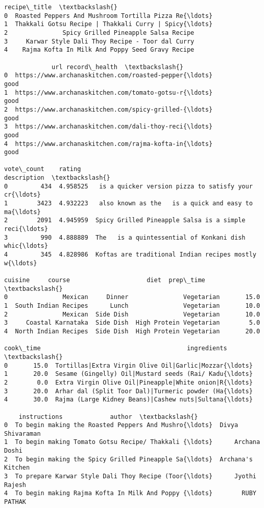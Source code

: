 \documentclass[14pt,a4paper,oneside]{extarticle}
\makeatletter
\newcommand{\boxspacing}{\kern\kvtcb@left@rule\kern\kvtcb@boxsep}
\newcommand{\prompt}[4]{
        {\ttfamily\llap{{\color{#2}[#3]:\hspace{3pt}#4}}\vspace{-\baselineskip}}
    }
\makeatother
\begin{document}
\begin{tcolorbox}[breakable, size=fbox, boxrule=.5pt,
	pad at break*=1mm, opacityfill=0]
\prompt{Out}{outcolor}{54}{\boxspacing}
\begin{Verbatim}[commandchars=\\\{\}]
	recipe\_title  \textbackslash{}
0  Roasted Peppers And Mushroom Tortilla Pizza Re{\ldots}
1  Thakkali Gotsu Recipe | Thakkali Curry | Spicy{\ldots}
2               Spicy Grilled Pineapple Salsa Recipe
3     Karwar Style Dali Thoy Recipe - Toor dal Curry
4    Rajma Kofta In Milk And Poppy Seed Gravy Recipe

			 url record\_health  \textbackslash{}
0  https://www.archanaskitchen.com/roasted-pepper{\ldots}          good
1  https://www.archanaskitchen.com/tomato-gotsu-r{\ldots}          good
2  https://www.archanaskitchen.com/spicy-grilled-{\ldots}          good
3  https://www.archanaskitchen.com/dali-thoy-reci{\ldots}          good
4  https://www.archanaskitchen.com/rajma-kofta-in{\ldots}          good

vote\_count    rating                                        description  \textbackslash{}
0         434  4.958525   is a quicker version pizza to satisfy your cr{\ldots}
1        3423  4.932223   also known as the   is a quick and easy to ma{\ldots}
2        2091  4.945959  Spicy Grilled Pineapple Salsa is a simple reci{\ldots}
3         990  4.888889  The   is a quintessential of Konkani dish whic{\ldots}
4         345  4.828986  Koftas are traditional Indian recipes mostly w{\ldots}

cuisine     course                     diet  prep\_time  \textbackslash{}
0               Mexican     Dinner               Vegetarian       15.0
1  South Indian Recipes      Lunch               Vegetarian       10.0
2               Mexican  Side Dish               Vegetarian       10.0
3     Coastal Karnataka  Side Dish  High Protein Vegetarian        5.0
4  North Indian Recipes  Side Dish  High Protein Vegetarian       20.0

cook\_time                                        ingredients  \textbackslash{}
0       15.0  Tortillas|Extra Virgin Olive Oil|Garlic|Mozzar{\ldots}
1       20.0  Sesame (Gingelly) Oil|Mustard seeds (Rai/ Kadu{\ldots}
2        0.0  Extra Virgin Olive Oil|Pineapple|White onion|R{\ldots}
3       20.0  Arhar dal (Split Toor Dal)|Turmeric powder (Ha{\ldots}
4       30.0  Rajma (Large Kidney Beans)|Cashew nuts|Sultana{\ldots}

	instructions             author  \textbackslash{}
0  To begin making the Roasted Peppers And Mushro{\ldots}  Divya Shivaraman
1  To begin making Tomato Gotsu Recipe/ Thakkali {\ldots}      Archana Doshi
2  To begin making the Spicy Grilled Pineapple Sa{\ldots}  Archana's Kitchen
3  To prepare Karwar Style Dali Thoy Recipe (Toor{\ldots}      Jyothi Rajesh
4  To begin making Rajma Kofta In Milk And Poppy {\ldots}        RUBY PATHAK


\end{Verbatim}
\end{tcolorbox}
\end{document}
